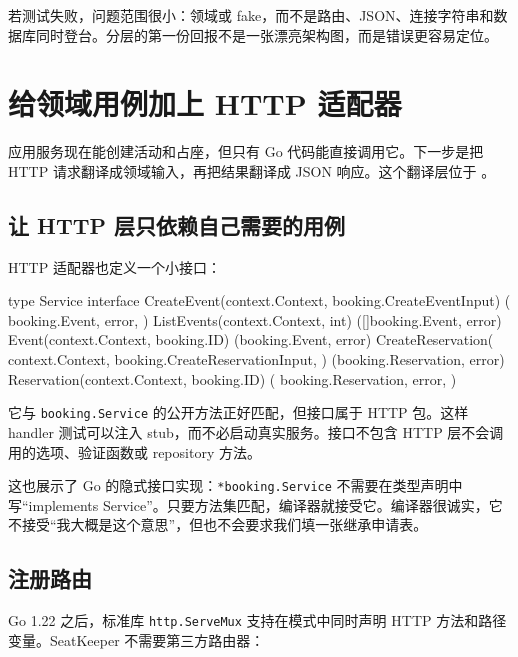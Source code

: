 若测试失败，问题范围很小：领域或 fake，而不是路由、JSON、连接字符串和数据库同时登台。分层的第一份回报不是一张漂亮架构图，而是错误更容易定位。

\section{给领域用例加上 HTTP 适配器}

应用服务现在能创建活动和占座，但只有 Go 代码能直接调用它。下一步是把 HTTP 请求翻译成领域输入，再把结果翻译成 JSON 响应。这个翻译层位于 。

\subsection{让 HTTP 层只依赖自己需要的用例}

HTTP 适配器也定义一个小接口：

\begin{gocode}[title={代码清单 12.24 \texttt{server.go}：HTTP 适配器需要的服务接口}]
type Service interface {
    CreateEvent(context.Context, booking.CreateEventInput) (
        booking.Event, error,
    )
    ListEvents(context.Context, int) ([]booking.Event, error)
    Event(context.Context, booking.ID) (booking.Event, error)
    CreateReservation(
        context.Context,
        booking.CreateReservationInput,
    ) (booking.Reservation, error)
    Reservation(context.Context, booking.ID) (
        booking.Reservation, error,
    )
}
\end{gocode}

它与 \texttt{booking.Service} 的公开方法正好匹配，但接口属于 HTTP 包。这样 handler 测试可以注入 stub，而不必启动真实服务。接口不包含 HTTP 层不会调用的选项、验证函数或 repository 方法。

这也展示了 Go 的隐式接口实现：\texttt{*booking.Service} 不需要在类型声明中写“implements Service”。只要方法集匹配，编译器就接受它。编译器很诚实，它不接受“我大概是这个意思”，但也不会要求我们填一张继承申请表。

\subsection{注册路由}

Go 1.22 之后，标准库 \texttt{http.ServeMux} 支持在模式中同时声明 HTTP 方法和路径变量。SeatKeeper 不需要第三方路由器：

